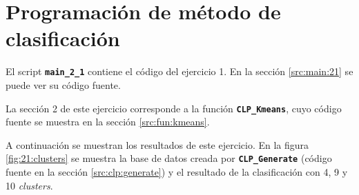 \documentclass[11pt]{article} %
\begin{document}
\section{Programación de método de clasificación}

El script \textbf{\texttt{main\_2\_1}} contiene el código del ejercicio 1. En
la sección \ref{src:main:21} se puede ver su código fuente.

La sección 2 de este ejercicio corresponde a la función
\textbf{\texttt{CLP\_Kmeans}}, cuyo código fuente se muestra en la sección
\ref{src:fun:kmeans}.

A continuación se muestran los resultados de este ejercicio. En la figura
\ref{fig:21:clusters} se muestra la base de datos creada
por \textbf{\texttt{CLP\_Generate}} (código fuente en la sección
\ref{src:clp:generate}) y el resultado de la clasificación con 4, 9 y 10
\emph{clusters}.
\end{document}
